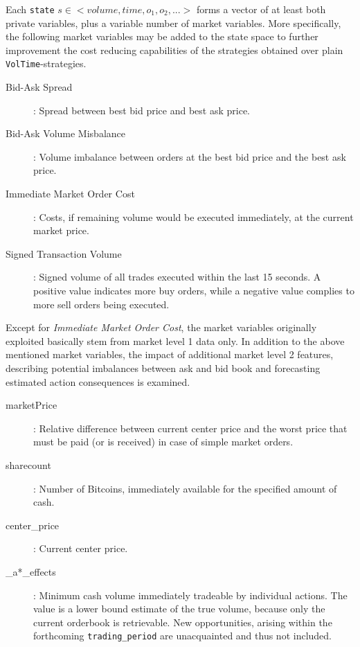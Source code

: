 Each \lstinline!state! $s \in <volume, time, o_1, o_2, ...>$ forms a vector of at least both private variables, plus a variable number of market variables. More specifically, the following market variables may be added to the state space to further improvement the cost reducing capabilities of the strategies obtained over plain \lstinline!VolTime!-strategies.

\begin{description}
\item[Bid-Ask Spread]: Spread between best bid price and best ask price.
\item[Bid-Ask Volume Misbalance]: Volume imbalance between orders at the best bid price and the best ask price.
\item[Immediate Market Order Cost]: Costs, if remaining volume would be executed immediately, at the current market price.
\item[Signed Transaction Volume]: Signed volume of all trades executed within the last 15 seconds. A positive value indicates more buy orders, while a negative value complies to more sell orders being executed.
\end{description}

Except for \emph{Immediate Market Order Cost}, the market variables originally exploited basically stem from market level 1 data only. In addition to the above mentioned market variables, the impact of additional market level 2 features, describing potential imbalances between ask and bid book and forecasting estimated action consequences is examined.
\begin{description}
\item[marketPrice] : Relative difference between current center price and the worst price that must be paid (or is received) in case of simple market orders.

\item[sharecount] : Number of Bitcoins, immediately available for the specified amount of cash.

\item[center\_price] : Current center price.

\item[\_a*\_effects] : Minimum cash volume immediately tradeable by individual actions. The value is a lower bound estimate of the true volume, because only the current orderbook is retrievable. New opportunities, arising within the forthcoming \lstinline!trading_period! are unacquainted and thus not included.
\end{description}

